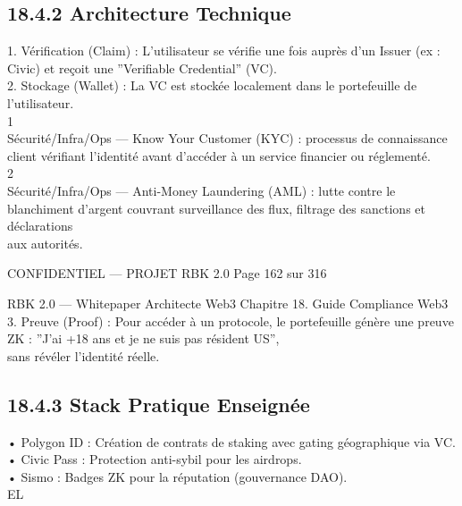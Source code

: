\subsection{18.4.2 Architecture Technique}
1. Vérification (Claim) : L’utilisateur se vérifie une fois auprès d’un Issuer (ex : Civic) et reçoit une ”Verifiable Credential” (VC).\\
\vspace{0.5em}
2. Stockage (Wallet) : La VC est stockée localement dans le portefeuille de l’utilisateur.\\
1\\
Sécurité/Infra/Ops — Know Your Customer (KYC) : processus de connaissance client vérifiant l’identité avant d’accéder à un service financier ou réglementé.\\
2\\
Sécurité/Infra/Ops — Anti-Money Laundering (AML) : lutte contre le blanchiment d’argent couvrant surveillance des flux, filtrage des sanctions et déclarations\\
aux autorités.\\
\vspace{0.5em}
\vspace{0.5em}
\vspace{0.5em}
\begin{confidential}CONFIDENTIEL — PROJET RBK 2.0                                          Page 162 sur 316\end{confidential}
RBK 2.0 — Whitepaper Architecte Web3                                                                Chapitre 18. Guide Compliance Web3\\
\vspace{0.5em}
\vspace{0.5em}
3. Preuve (Proof) : Pour accéder à un protocole, le portefeuille génère une preuve ZK : ”J’ai +18 ans et je ne suis pas résident US”,\\
sans révéler l’identité réelle.\\
\vspace{0.5em}
\vspace{0.5em}
\subsection{18.4.3 Stack Pratique Enseignée}
• Polygon ID : Création de contrats de staking avec gating géographique via VC.\\
\vspace{0.5em}
• Civic Pass : Protection anti-sybil pour les airdrops.\\
\vspace{0.5em}
• Sismo : Badges ZK pour la réputation (gouvernance DAO).\\
\vspace{0.5em}
\vspace{0.5em}
\vspace{0.5em}
\vspace{0.5em}
EL\\
